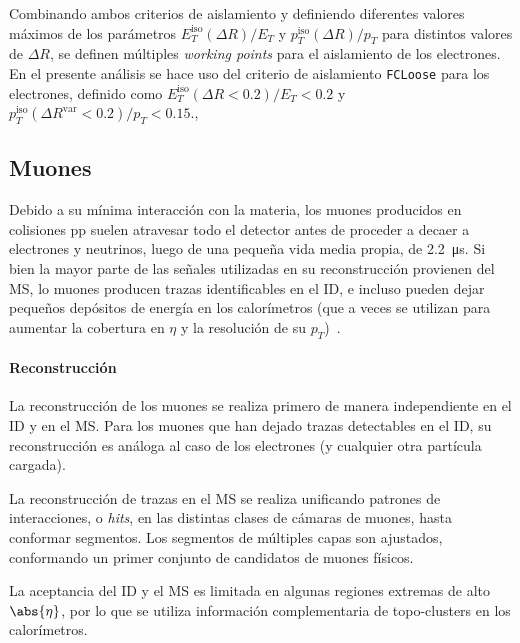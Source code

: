 Combinando ambos criterios de aislamiento y definiendo diferentes valores máximos de los parámetros $E_T^{\text{iso}}(\Delta R)/E_T$ y $p_T^{\text{iso}}(\Delta R)/p_T$ para distintos valores de $\Delta R$, se definen múltiples \textit{working points} para el aislamiento de los electrones. En el presente análisis se hace uso del criterio de aislamiento \texttt{FCLoose} para los electrones, definido como $E_T^{\text{iso}}(\Delta R < 0.2)/E_T < 0.2$ y $p_T^{\text{iso}}(\Delta R^{\text{var}} < 0.2)/p_T < 0.15$.,



\subsection{Muones}

Debido a su mínima interacción con la materia, los muones producidos en colisiones pp suelen atravesar todo el detector antes de proceder a decaer a electrones y neutrinos, luego de una pequeña vida media propia, de \SI{2.2}{\micro\second}. Si bien la mayor parte de las señales utilizadas en su reconstrucción provienen del MS, lo muones producen trazas identificables en el ID, e incluso pueden dejar pequeños depósitos de energía en los calorímetros (que a veces se utilizan para aumentar la cobertura en $\eta$ y la resolución de su $p_T$)~\cite{TheATLASCollaboration2016}.

\paragraph{Reconstrucción}

La reconstrucción de los muones se realiza primero de manera independiente en el ID y en el MS. Para los muones que han dejado trazas detectables en el ID, su reconstrucción es análoga al caso de los electrones (y cualquier otra partícula cargada).

La reconstrucción de trazas en el MS se realiza unificando patrones de interacciones, o \textit{hits}, en las distintas clases de cámaras de muones, hasta conformar segmentos. Los segmentos de múltiples capas son ajustados, conformando un primer conjunto de candidatos de muones físicos.

La aceptancia del ID y el MS es limitada en algunas regiones extremas de alto $\abs{\eta}$, por lo que se utiliza información complementaria de topo-clusters en los calorímetros.

